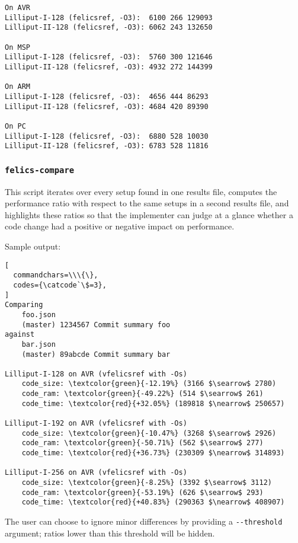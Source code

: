 \documentclass{article}
\begin{document}
\begin{verbatim}
On AVR
Lilliput-I-128 (felicsref, -O3):  6100 266 129093
Lilliput-II-128 (felicsref, -O3): 6062 243 132650

On MSP
Lilliput-I-128 (felicsref, -O3):  5760 300 121646
Lilliput-II-128 (felicsref, -O3): 4932 272 144399

On ARM
Lilliput-I-128 (felicsref, -O3):  4656 444 86293
Lilliput-II-128 (felicsref, -O3): 4684 420 89390

On PC
Lilliput-I-128 (felicsref, -O3):  6880 528 10030
Lilliput-II-128 (felicsref, -O3): 6783 528 11816
\end{verbatim}

\subsubsection{\texttt{felics-compare}}

This script iterates over every setup found in one results file,
computes the performance ratio with respect to the same setups in a
second results file, and highlights these ratios so that the
implementer can judge at a glance whether a code change had a positive
or negative impact on performance.

Sample output:

\begin{Verbatim}[
  commandchars=\\\{\},
  codes={\catcode`\$=3},
]
Comparing
	foo.json
	(master) 1234567 Commit summary foo
against
	bar.json
	(master) 89abcde Commit summary bar

Lilliput-I-128 on AVR (vfelicsref with -Os)
	code_size: \textcolor{green}{-12.19%} (3166 $\searrow$ 2780)
	code_ram: \textcolor{green}{-49.22%} (514 $\searrow$ 261)
	code_time: \textcolor{red}{+32.05%} (189818 $\nearrow$ 250657)

Lilliput-I-192 on AVR (vfelicsref with -Os)
	code_size: \textcolor{green}{-10.47%} (3268 $\searrow$ 2926)
	code_ram: \textcolor{green}{-50.71%} (562 $\searrow$ 277)
	code_time: \textcolor{red}{+36.73%} (230309 $\nearrow$ 314893)

Lilliput-I-256 on AVR (vfelicsref with -Os)
	code_size: \textcolor{green}{-8.25%} (3392 $\searrow$ 3112)
	code_ram: \textcolor{green}{-53.19%} (626 $\searrow$ 293)
	code_time: \textcolor{red}{+40.83%} (290363 $\nearrow$ 408907)
\end{Verbatim}

The user can choose to ignore minor differences by providing a
\texttt{-{}-threshold} argument; ratios lower than this threshold will
be hidden.
\end{document}
